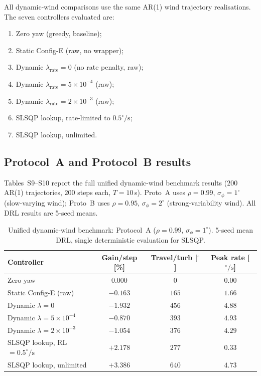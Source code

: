 \documentclass{article}
\begin{document}
All dynamic-wind comparisons use the same AR(1) wind trajectory realisations. The seven controllers evaluated are:
\begin{enumerate}
\item Zero yaw (greedy, baseline);
\item Static Config-E (raw, no wrapper);
\item Dynamic $\lambda_\mathrm{rate}{=}0$ (no rate penalty, raw);
\item Dynamic $\lambda_\mathrm{rate}{=}5{\times}10^{-4}$ (raw);
\item Dynamic $\lambda_\mathrm{rate}{=}2{\times}10^{-3}$ (raw);
\item SLSQP lookup, rate-limited to $0.5^\circ\!/\!\mathrm{s}$;
\item SLSQP lookup, unlimited.
\end{enumerate}

\subsection{Protocol~A and Protocol~B results}

Tables~S9--S10 report the full unified dynamic-wind benchmark results ($200$ AR(1) trajectories, $200$ steps each, $T{=}10$\,s). Proto~A uses $\rho{=}0.99$, $\sigma_\phi{=}1^\circ$ (slow-varying wind); Proto~B uses $\rho{=}0.95$, $\sigma_\phi{=}2^\circ$ (strong-variability wind). All DRL results are 5-seed means.

\begin{table}[h]
\centering
\caption{Unified dynamic-wind benchmark: Protocol~A ($\rho{=}0.99$, $\sigma_\phi{=}1^\circ$). 5-seed mean DRL, single deterministic evaluation for SLSQP.}
\label{tab:dyn_protoA}
\small
\begin{tabular}{lccc}
\toprule
Controller & Gain/step [\%] & Travel/turb [$^\circ$] & Peak rate [$^\circ\!/\!\mathrm{s}$] \\
\midrule
Zero yaw                      & $0.000$ & $0$   & $0.00$ \\
Static Config-E (raw)         & $-0.163$ & $165$ & $1.66$ \\
Dynamic $\lambda{=}0$          & $-1.932$ & $456$ & $4.88$ \\
Dynamic $\lambda{=}5{\times}10^{-4}$ & $-0.870$ & $393$ & $4.93$ \\
Dynamic $\lambda{=}2{\times}10^{-3}$ & $-1.054$ & $376$ & $4.29$ \\
SLSQP lookup, RL${=}0.5^\circ\!/\!\mathrm{s}$ & $+2.178$ & $277$ & $0.33$ \\
SLSQP lookup, unlimited       & $+3.386$ & $640$ & $4.73$ \\
\bottomrule
\end{tabular}
\end{table}
\end{document}
